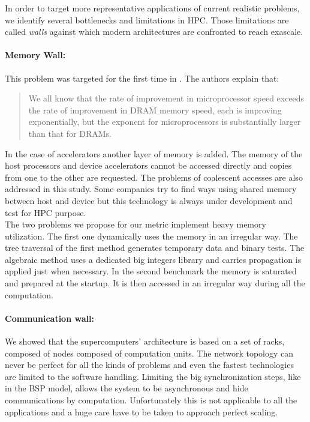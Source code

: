 In order to target more representative applications of current realistic problems, we identify several bottlenecks and limitations in HPC. 
Those limitations are called \textit{walls} against which modern architectures are confronted to reach exascale. 

\paragraph{Memory Wall: }
This problem was targeted for the first time in \cite{wulf1995hitting}.
The authors explain that:
\begin{quotation} We all know that the rate of improvement in microprocessor speed exceeds the rate of improvement in DRAM memory speed, each is improving exponentially, but the exponent for microprocessors is substantially larger than that for DRAMs.
\end{quotation}
In the case of accelerators another layer of memory is added. 
The memory of the host processors and device accelerators cannot be accessed directly and copies from one to the other are requested.
The problems of coalescent accesses are also addressed in this study.
Some companies try to find ways using shared memory between host and device but this technology is always under development and test for HPC purpose. \\

The two problems we propose for our metric implement heavy memory utilization. 
The first one dynamically uses the memory in an irregular way. 
The tree traversal of the first method generates temporary data and binary tests. 
The algebraic method uses a dedicated big integers library and carries propagation is applied just when necessary. 
In the second benchmark the memory is saturated and prepared at the startup.
It is then accessed in an irregular way during all the computation. 

\paragraph{Communication wall: } 
We showed that the supercomputers' architecture is based on a set of racks, composed of nodes composed of computation units. 
The network topology can never be perfect for all the kinds of problems and even the fastest technologies are limited to the software handling. 
Limiting the big synchronization steps, like in the BSP model, allows the system to be asynchronous and hide communications by computation. 
Unfortunately this is not applicable to all the applications and a huge care have to be taken to approach perfect scaling.\\

